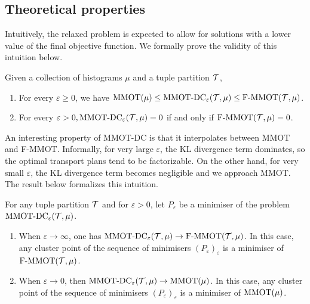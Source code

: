 \subsection{Theoretical properties}
Intuitively, the relaxed problem is expected to allow for solutions with a lower value of the final objective function. We formally prove the validity of this intuition below.
\begin{proposition}
  \label{MMOT_dc_prop}
  Given a collection of histograms $\mu$ and a tuple partition $\mathcal T$,
  \begin{enumerate}
    \item For every $\varepsilon \geq 0$, we have $\text{MMOT}(\mu) \leq
    \text{MMOT-DC}_{\varepsilon}(\mathcal T, \mu) \leq \text{F-MMOT}( \mathcal T, \mu)$.
    \item For every $\varepsilon > 0, \text{MMOT-DC}_{\varepsilon}( \mathcal T, \mu ) = 0$ if and only if
    $\text{F-MMOT} (\mathcal T, \mu) = 0$.
  \end{enumerate}
\end{proposition}
An interesting property of MMOT-DC is that it interpolates between MMOT and F-MMOT. Informally,
for very large $\varepsilon$, the KL divergence term dominates, so the optimal transport plans tend to be factorizable.
On the other hand, for very small $\varepsilon$, the KL divergence term becomes negligible and we approach MMOT.
The result below formalizes this intuition.
\begin{proposition}
  \label{interpolation_prop}
  For any tuple partition $\mathcal T$ and for $\varepsilon > 0$,
  let $P_{\varepsilon}$ be a minimiser of the problem $\text{MMOT-DC}_{\varepsilon}(\mathcal T, \mu)$.
  \begin{enumerate}
    \item When $\varepsilon \to \infty$, one has $\text{MMOT-DC}_{\varepsilon}(\mathcal T, \mu) \to
    \text{F-MMOT}(\mathcal T, \mu)$. In this case, any cluster point of the sequence of minimisers
    $(P_{\varepsilon})_{\varepsilon}$ is a minimiser of $\text{F-MMOT}(\mathcal T, \mu)$.

    \item When $\varepsilon \to 0$, then $\text{MMOT-DC}_{\varepsilon}(\mathcal T, \mu) \to \text{MMOT}(\mu)$.
    In this case, any cluster point of the sequence of minimisers $(P_{\varepsilon})_{\varepsilon}$ is a minimiser of
    $\text{MMOT}(\mu)$.
  \end{enumerate}
\end{proposition}
